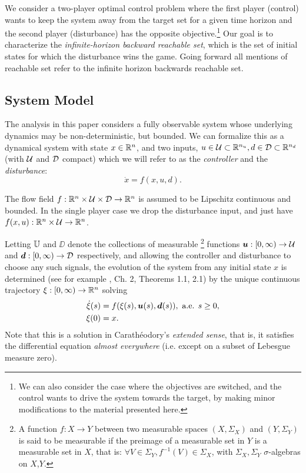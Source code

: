 
We consider a two-player optimal control problem where the first player (control) wants to keep the system away from the target set for a given time horizon and the second player (disturbance) has the opposite objective.\footnote{We can also consider the case where the objectives are switched, and the control wants to drive the system towards the target, by making minor modifications to the material presented here.} Our goal is to characterize the \emph{infinite-horizon backward reachable set}, which is the set of initial states for which the disturbance wins the game. Going forward all mentions of reachable set refer to the infinite horizon backwards reachable set.

\subsection{System Model \label{subsec:dynamics}}

The analysis in this paper considers a fully observable system whose underlying dynamics may be non-deterministic, but bounded. 
We can formalize this as a dynamical system with state $x\in\mathbb{R}^n$, and two inputs, $u\in\mathcal{U}\subset\mathbb{R}^{n_u},  d\in\mathcal{D}\subset\mathbb{R}^{n_d}$
(with $\mathcal{U}$ and $\mathcal{D}$ compact)
which we will refer to as the \emph{controller} and the \emph{disturbance}:
\begin{equation}\label{fxud}
\dot{x} = f(x,u, d).
\end{equation}

The flow field $f: \mathbb{R}^n \times \mathcal{U} \times \mathcal{D}\rightarrow\mathbb{R}^n$ is assumed to be Lipschitz continuous and bounded. In the single player case we drop the disturbance input, and just have $f(x,u):\mathbb{R}^n \times \mathcal{U} \rightarrow\mathbb{R}^n$.

Letting $\mathbb{U} $ and $\DD$ denote the collections of measurable%
	\footnote{A function $f:X\to Y$ between two measurable spaces $(X,\Sigma_X)$ and $(Y,\Sigma_Y)$
	is said to be measurable if the preimage of a measurable set in $Y$ is a measurable set in $X$, that is:
	$\forall V\in\Sigma_Y, f^{-1}(V)\in\Sigma_X$, with $\Sigma_X,\Sigma_Y$ $\sigma$-algebras on $X$,$Y$.}
functions $\bm u: [0,\infty)\to \mathcal{U} $ and $\bm d: [0,\infty)\to \mathcal{D}$ respectively,
and allowing the controller and disturbance to choose any such signals,
the evolution of the system
from any initial state $x$
is determined (see for example \cite{Coddington1955}, Ch. 2, Theorems 1.1, 2.1) by the unique continuous trajectory $\xi:[0,\infty)\to\mathbb{R}^n$ solving
\begin{equation}\label{eq:xdot}
\begin{split}
\dot{\xi}(s) &= f(\xi(s),\bm{u}(s),\bm{d}(s)), \text{ a.e. }s\ge 0,\\
\xi(0) &= x.
\end{split}
\end{equation}
Note that this is a solution in Carath\'eodory's \emph{extended sense}, that is, it satisfies the differential equation \emph{almost everywhere} (i.e. except on a subset of Lebesgue measure zero).


